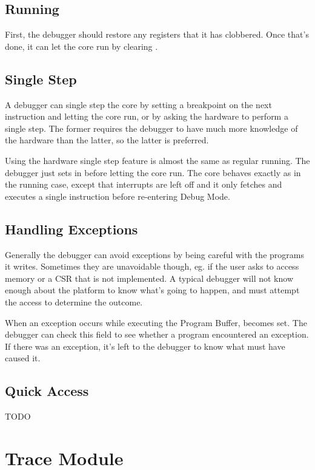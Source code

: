 \documentclass{article}
\begin{document}
\subsection{Running}

First, the debugger should restore any registers that it has clobbered.  Once
that's done, it can let the core run by clearing \Fhalt.

\subsection{Single Step}

A debugger can single step the core by setting a breakpoint on the next
instruction and letting the core run, or by asking the hardware to perform a
single step. The former requires the debugger to have much more knowledge of
the hardware than the latter, so the latter is preferred.

Using the hardware single step feature is almost the same as regular running.
The debugger just sets \Fstep in \Rdcsr before letting the core run. The core
behaves exactly as in the running case, except that interrupts are left off and
it only fetches and executes a single instruction before re-entering Debug
Mode.

\subsection{Handling Exceptions}

Generally the debugger can avoid exceptions by being careful with the programs
it writes. Sometimes they are unavoidable though, eg. if the user asks to
access memory or a CSR that is not implemented. A typical debugger will not
know enough about the platform to know what's going to happen, and must attempt
the access to determine the outcome.

When an exception occurs while executing the Program Buffer, \Fcmderr becomes
set. The debugger can check this field to see whether a program encountered an
exception.  If there was an exception, it's left to the debugger to know what
must have caused it.

\subsection{Quick Access} \label{quickaccess}

TODO

\section{Trace Module}
\end{document}
